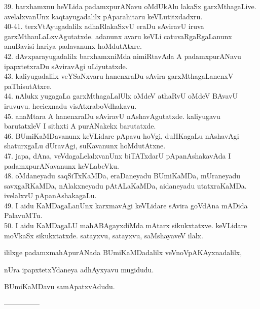 \documentclass{article}
\begin{document}
39. barxhamxnu heVLida padamxpurANavu oMdUkAlu lakaSx garxMthagaLive. avelalxvanUnx kaqtayugadalilx pAparahitaru keVLutitxdadxru.\\
40-41. terxVtAyugadalilx adhaRlakaSxvU eraDu sAviravU iruva garxMthauLaLxvAgutatxde. adanunx avaru keVLi catuvaRgaRgaLanunx anuBavisi hariya padavanunx hoMdutAtxre.\\
42. dAvxparayugadalilx barxhamxniMda nimiRtavAda A padamxpurANavu ipapxtetxraDu sAviravAgi uLiyutatxde.\\
43. kaliyugadalilx veYSaNxvaru hanenxraDu sAvira garxMthagaLanenxV paThisutAtxre.\\
44. nAlukx yugagaLa garxMthagaLalUlx oMdeV athaRvU oMdeV BAvavU iruvuvu. hecicxnadu visAtxraboVdhakavu.\\
45. anaMtara A hanenxraDu sAviravU nAshavAgutatxde. kaliyugavu barutatxleV I sithxti A purANakekx barutatxde.\\
46. BUmiKaMDavanunx keVLidare pApavu hoVgi, duHKagaLu nAshavAgi shaturxgaLu dUravAgi, suKavanunx hoMdutAtxne.\\
47. japa, dAna, veVdagaLelalxvanUnx biTATxdarU pApanAshakavAda I padamxpurANavanunx keVLabeVku.\\
48. oMdaneyadu saqSiTxKaMDa, eraDaneyadu BUmiKaMDa, mUraneyadu savxgaRKaMDa, nAlakxneyadu pAtALaKaMDa, aidaneyadu utatxraKaMDa. ivelalxvU pApanAshakagaLu.\\
49. I aidu KaMDagaLanUnx karxmavAgi keVLidare sAvira goVdAna mADida PalavuMTu.\\
50. I aidu KaMDagaLU mahABAgayxdiMda mAtarx sikukxtatxve. keVLidare moVkaSx sikukxtatxde. satayxvu, satayxvu, saMshayaveV ilalx.

\begin{center}
ililxge padamxmahApurANada BUmiKaMDadalilx veVnoVpAKAyxnadalilx,
\end{center}

\begin{center}
nUra ipapxtetxYdaneya adhAyxyavu mugidudu.
\end{center}

\begin{center}
BUmiKaMDavu samApatxvAdudu.
\end{center}

\begin{center}
---------------
\end{center}
\end{document}
